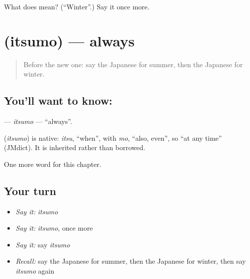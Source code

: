 \begin{tcolorbox}[breakable,colback=teal!4,colframe=teal!35!black,title={Before you move on}]
What does  mean? (\textquotedblleft{}Winter\textquotedblright{}.) Say it once more.
\end{tcolorbox}
\section[\texorpdfstring{\ja{いつも} (itsumo)}{いつも (itsumo)}]{ (itsumo) — always}

\label{lesson:JA-C55-itsumo}



\begin{quote}
Before the new one: say the Japanese for summer, then the Japanese for winter.
\end{quote}

\subsection*{You'll want to know: }
\textbf{} — \emph{itsumo} — \textquotedblleft{}always\textquotedblright{}.

\begin{cousinweb}
\textbf{} (\emph{itsumo}) is native: \emph{itsu}, \textquotedblleft{}when\textquotedblright{}, with \emph{mo}, \textquotedblleft{}also, even\textquotedblright{}, so \textquotedblleft{}at any time\textquotedblright{} (JMdict). It is inherited rather than borrowed.
\end{cousinweb}

\begin{grammarlens}[title={What you've built}]
One more word for this chapter.
\end{grammarlens}

\subsection*{Your turn}
\begin{itemize}
\raggedright
  \item \emph{Say it:} \emph{itsumo}
  \item \emph{Say it:} \emph{itsumo}, once more
  \item \emph{Say it:} say \emph{itsumo}
  \item \emph{Recall:} say the Japanese for summer, then the Japanese for winter, then say \emph{itsumo} again
\end{itemize}

